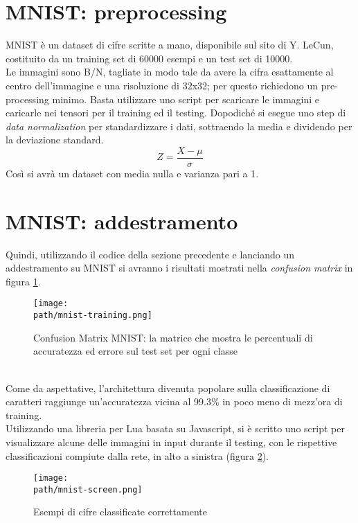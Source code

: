 \section{MNIST: preprocessing}
MNIST è un dataset di cifre scritte a mano, disponibile sul sito di Y. LeCun\parencite{Wlecun}, costituito da un training set di 60000 esempi e un test set di 10000. 
\\
Le immagini sono B/N, tagliate in modo tale da avere la cifra esattamente al centro dell’immagine e una risoluzione di 32x32; per questo richiedono un pre-processing minimo. Basta utilizzare uno script per scaricare le immagini e caricarle nei tensori per il training ed il testing. Dopodiché si esegue uno step di \emph{data normalization} per standardizzare i dati, sottraendo la media e dividendo per la deviazione standard. 
$$
Z = \frac{X-\mu}{\sigma}
$$
Così si avrà un dataset con media nulla e varianza pari a 1. 

\section{MNIST: addestramento}
Quindi, utilizzando il codice della sezione precedente e lanciando un addestramento su MNIST si avranno i risultati mostrati nella \emph{confusion matrix} in figura \ref{fig:mnist-training}. 
\begin{figure}[h!]
 \centering
 \texttt{[image: \\path/mnist-training.png]} 
 \caption{Confusion Matrix MNIST: la matrice che mostra le percentuali di accuratezza ed errore sul test set per ogni classe}
 \label{fig:mnist-training}
\end{figure}
\\
Come da aspettative, l'architettura divenuta popolare sulla classificazione di caratteri raggiunge un'accuratezza vicina al 99.3\% in poco meno di mezz'ora di training. \\
Utilizzando una libreria per Lua basata su Javascript, si è scritto uno script per visualizzare alcune delle immagini in input durante il testing, con le rispettive classificazioni compiute dalla rete, in alto a sinistra (figura \ref{fig:mnist-correct}).
\begin{figure}[h!]
 \centering
 \texttt{[image: \\path/mnist-screen.png]} 
 \caption{Esempi di cifre classificate correttamente}
 \label{fig:mnist-correct}
\end{figure}

